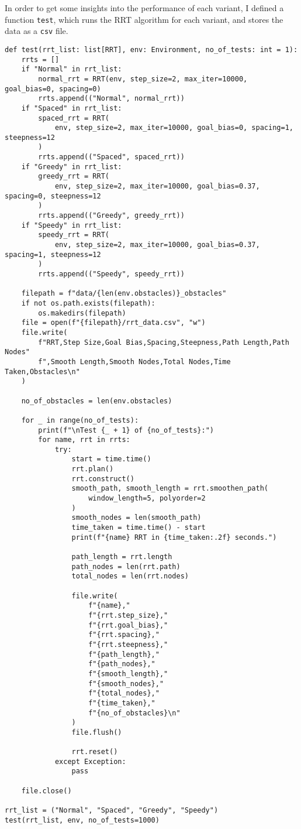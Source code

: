 \documentclass[12pt]{report}
\begin{document}
In order to get some insights into the performance of each variant, I defined a function \texttt{test}, which runs the RRT algorithm for each variant, and stores the data as a \texttt{csv} file.
\begin{lstlisting}[caption={Testing}]
def test(rrt_list: list[RRT], env: Environment, no_of_tests: int = 1):
    rrts = []
    if "Normal" in rrt_list:
        normal_rrt = RRT(env, step_size=2, max_iter=10000, goal_bias=0, spacing=0)
        rrts.append(("Normal", normal_rrt))
    if "Spaced" in rrt_list:
        spaced_rrt = RRT(
            env, step_size=2, max_iter=10000, goal_bias=0, spacing=1, steepness=12
        )
        rrts.append(("Spaced", spaced_rrt))
    if "Greedy" in rrt_list:
        greedy_rrt = RRT(
            env, step_size=2, max_iter=10000, goal_bias=0.37, spacing=0, steepness=12
        )
        rrts.append(("Greedy", greedy_rrt))
    if "Speedy" in rrt_list:
        speedy_rrt = RRT(
            env, step_size=2, max_iter=10000, goal_bias=0.37, spacing=1, steepness=12
        )
        rrts.append(("Speedy", speedy_rrt))

    filepath = f"data/{len(env.obstacles)}_obstacles"
    if not os.path.exists(filepath):
        os.makedirs(filepath)
    file = open(f"{filepath}/rrt_data.csv", "w")
    file.write(
        f"RRT,Step Size,Goal Bias,Spacing,Steepness,Path Length,Path Nodes"
        f",Smooth Length,Smooth Nodes,Total Nodes,Time Taken,Obstacles\n"
    )

    no_of_obstacles = len(env.obstacles)

    for _ in range(no_of_tests):
        print(f"\nTest {_ + 1} of {no_of_tests}:")
        for name, rrt in rrts:
            try:
                start = time.time()
                rrt.plan()
                rrt.construct()
                smooth_path, smooth_length = rrt.smoothen_path(
                    window_length=5, polyorder=2
                )
                smooth_nodes = len(smooth_path)
                time_taken = time.time() - start
                print(f"{name} RRT in {time_taken:.2f} seconds.")

                path_length = rrt.length
                path_nodes = len(rrt.path)
                total_nodes = len(rrt.nodes)

                file.write(
                    f"{name},"
                    f"{rrt.step_size},"
                    f"{rrt.goal_bias},"
                    f"{rrt.spacing},"
                    f"{rrt.steepness},"
                    f"{path_length},"
                    f"{path_nodes},"
                    f"{smooth_length},"
                    f"{smooth_nodes},"
                    f"{total_nodes},"
                    f"{time_taken},"
                    f"{no_of_obstacles}\n"
                )
                file.flush()

                rrt.reset()
            except Exception:
                pass

    file.close()

rrt_list = ("Normal", "Spaced", "Greedy", "Speedy")
test(rrt_list, env, no_of_tests=1000)
\end{lstlisting}
\end{document}
